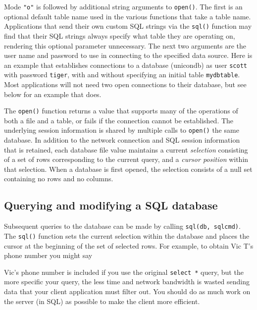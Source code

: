 Mode \texttt{"o"} is followed by additional string arguments to
\texttt{open()}. The first is an optional default table name used in
the various functions that take a table name.  Applications that send
their own custom SQL strings via the \texttt{sql()} function may find that
their SQL strings always specify what table they are operating on,
rendering this optional parameter unnecessary.  The next two arguments
are the user name and password to use in connecting to the specified
data source. Here is an example that establishes connections to a
database (unicondb) as user \texttt{scott} with password \texttt{tiger}, with and
without specifying an initial table \texttt{mydbtable}.  Most applications
will not need two open connections to their database, but see below
for an example that does.


The \texttt{open()} function returns a value that supports many of the
operations of both a file and a table, or fails if the connection
cannot be established. The underlying session information is shared by
multiple calls to \texttt{open()} the same database. In addition to
the network connection and SQL session information that is retained,
each database file value maintains a current \textit{selection}
consisting of a set of rows corresponding to the current query, and a
\textit{cursor position} within that selection. When a database is
first opened, the selection consists of a null set containing no rows
and no columns.

\subsection*{Querying and modifying a SQL database}

Subsequent queries to the database can be made by calling
\texttt{sql(db, sqlcmd)}. The \texttt{sql()} function sets
the current selection within the database and places the cursor at the
beginning of the set of selected rows. For example, to obtain Vic
T's phone number you might say


Vic's phone number is included if you use the original
\texttt{select *} query, but the more specific your query, the less
time and network bandwidth is wasted sending data that your client
application must filter out. You should do as much work on the server
(in SQL) as possible to make the client more efficient.


